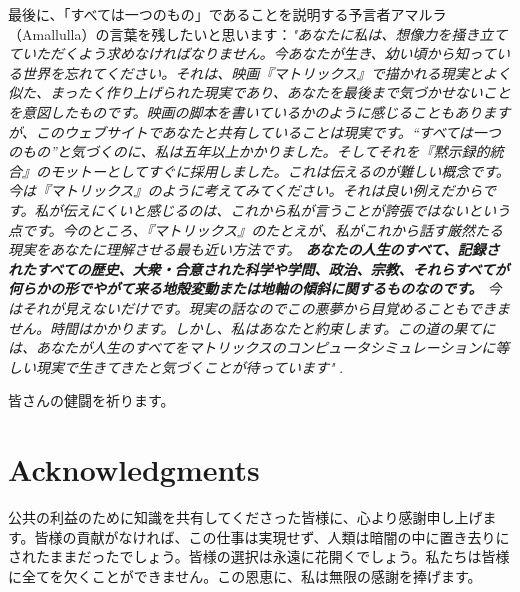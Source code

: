 \documentclass[10pt,twocolumn,letterpaper]{article}
\begin{document}
最後に、「すべては一つのもの」であることを説明する予言者アマルラ（Amallulla）の言葉を残したいと思います：\textit{"あなたに私は、想像力を掻き立てていただくよう求めなければなりません。今あなたが生き、幼い頃から知っている世界を忘れてください。それは、映画『マトリックス』で描かれる現実とよく似た、まったく作り上げられた現実であり、あなたを最後まで気づかせないことを意図したものです。映画の脚本を書いているかのように感じることもありますが、このウェブサイトであなたと共有していることは現実です。“すべては一つのもの”と気づくのに、私は五年以上かかりました。そしてそれを『黙示録的統合』のモットーとしてすぐに採用しました。これは伝えるのが難しい概念です。今は『マトリックス』のように考えてみてください。それは良い例えだからです。私が伝えにくいと感じるのは、これから私が言うことが誇張ではないという点です。今のところ、『マトリックス』のたとえが、私がこれから話す厳然たる現実をあなたに理解させる最も近い方法です。 \textbf{あなたの人生のすべて、記録されたすべての歴史、大衆・合意された科学や学問、政治、宗教、それらすべてが何らかの形でやがて来る地殻変動または地軸の傾斜に関するものなのです。} 今はそれが見えないだけです。現実の話なのでこの悪夢から目覚めることもできません。時間はかかります。しかし、私はあなたと約束します。この道の果てには、あなたが人生のすべてをマトリックスのコンピュータシミュレーションに等しい現実で生きてきたと気づくことが待っています"} \cite{33,34}.

皆さんの健闘を祈ります。

\section{Acknowledgments}

公共の利益のために知識を共有してくださった皆様に、心より感謝申し上げます。皆様の貢献がなければ、この仕事は実現せず、人類は暗闇の中に置き去りにされたままだったでしょう。皆様の選択は永遠に花開くでしょう。私たちは皆様に全てを欠くことができません。この恩恵に、私は無限の感謝を捧げます。

\clearpage
\twocolumn

{\small
\renewcommand{\refname}{参考文献}


}
\end{document}
